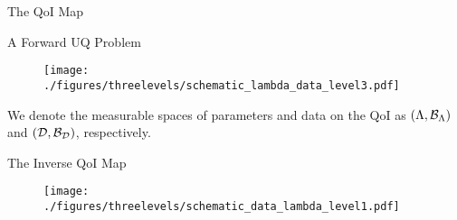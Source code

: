 \begin{frame}{The QoI Map}




\end{frame}

\begin{frame}{A Forward UQ Problem}

\begin{figure}[h]
	\texttt{[image: ./figures/threelevels/schematic\_lambda\_data\_level3.pdf]}
\end{figure}

{We denote the measurable spaces of parameters and data on the QoI as $({\Lambda},\mathcal{B}_{{\Lambda}})$ and $(\mathcal{D},\mathcal{B}_{\mathcal{D}})$, respectively.}
\bigskip


\end{frame}

\begin{frame}{The Inverse QoI Map}

\begin{figure}[h]
	\texttt{[image: ./figures/threelevels/schematic\_data\_lambda\_level1.pdf]}
\end{figure}

\end{frame}

